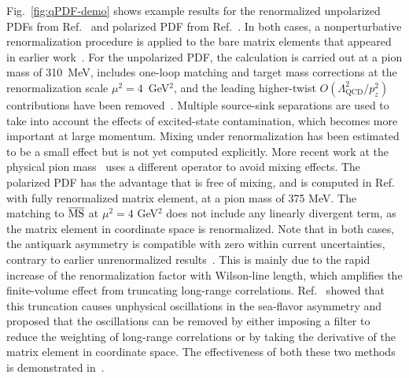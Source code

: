Fig.~\ref{fig:qPDF-demo} shows example results for the renormalized unpolarized 
PDFs from Ref.~\cite{Chen:2017mzz} and polarized PDF from 
Ref.~\cite{Alexandrou:2017huk}.
In both cases, a nonperturbative renormalization procedure is applied to the 
bare matrix elements that appeared in earlier work~\cite{Lin:2014zya,
Alexandrou:2015rja,Chen:2016utp,Alexandrou:2016jqi,Alexandrou:2016eyt}.
%
For the unpolarized PDF, the calculation is carried out at a pion mass of 
310~MeV, includes one-loop matching and target mass corrections at the 
renormalization scale $\mu^2=4$~GeV$^2$, and the leading higher-twist 
$O(\Lambda_\text{QCD}^2/p_z^2)$ contributions have been 
removed~\cite{Chen:2016utp}. 
%
Multiple source-sink separations are used to take into account the effects of 
excited-state contamination, which becomes more important at large momentum. 
%
Mixing under renormalization has been estimated to be a small effect but is not 
yet computed explicitly. 
%
More recent work at the physical pion mass~\cite{Lin:2017ani} uses a different 
operator to avoid mixing effects. 
%
The polarized PDF has the advantage that is free of mixing, and is computed in
Ref.~\cite{Alexandrou:2017huk}  with fully renormalized matrix element, 
at a pion mass of 375 MeV. 
%
The matching to $\overline{\rm MS}$ at $\mu^2=4$ GeV$^2$ does not include any 
linearly divergent term, as the matrix element in 
coordinate space is renormalized.
% 
Note that in both cases, the antiquark asymmetry is compatible with zero 
within current uncertainties, contrary to earlier unrenormalized 
results~\cite{Lin:2014zya,Alexandrou:2015rja,Chen:2016utp,Alexandrou:2016eyt}.
%
This is mainly due to the rapid increase of the renormalization factor with 
Wilson-line length, which amplifies the finite-volume effect from truncating 
long-range correlations. 
%
Ref.~\cite{Lin:2017ani} showed that this truncation causes unphysical 
oscillations in the sea-flavor asymmetry and proposed that the oscillations 
can be removed by either imposing a filter to reduce the weighting of 
long-range correlations or by taking the derivative of the matrix element in 
coordinate space. 
%
The effectiveness of both these two methods is 
demonstrated in~\cite{Lin:2017ani}. 

